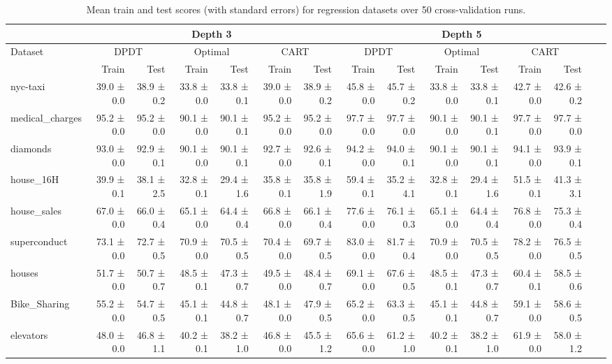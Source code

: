 \begin{table}
\centering
\footnotesize
\caption{Mean train and test scores (with standard errors) for regression datasets over 50 cross-validation runs.}\label{tab:regression}
\begin{tabular}{l|rr|rr|rr||rr|rr|rr|rr}
\hline
 & \multicolumn{6}{c||}{\textbf{Depth 3}} & \multicolumn{6}{c|}{\textbf{Depth 5}} \\ \hline
Dataset & \multicolumn{2}{c|}{DPDT} & \multicolumn{2}{c|}{Optimal} & \multicolumn{2}{c||}{CART} & \multicolumn{2}{c|}{DPDT} & \multicolumn{2}{c|}{Optimal} & \multicolumn{2}{c|}{CART} \\
 & Train & Test & Train & Test & Train & Test & Train & Test & Train & Test & Train & Test \\
\hline
nyc-taxi & 39.0 ± 0.0 & 38.9 ± 0.2 & 33.8 ± 0.0 & 33.8 ± 0.1 & 39.0 ± 0.0 & 38.9 ± 0.2 & 45.8 ± 0.0 & 45.7 ± 0.2 & 33.8 ± 0.0 & 33.8 ± 0.1 & 42.7 ± 0.0 & 42.6 ± 0.2 \\
medical\_charges & 95.2 ± 0.0 & 95.2 ± 0.0 & 90.1 ± 0.0 & 90.1 ± 0.1 & 95.2 ± 0.0 & 95.2 ± 0.0 & 97.7 ± 0.0 & 97.7 ± 0.0 & 90.1 ± 0.0 & 90.1 ± 0.1 & 97.7 ± 0.0 & 97.7 ± 0.0 \\
diamonds & 93.0 ± 0.0 & 92.9 ± 0.1 & 90.1 ± 0.0 & 90.1 ± 0.1 & 92.7 ± 0.0 & 92.6 ± 0.1 & 94.2 ± 0.0 & 94.0 ± 0.1 & 90.1 ± 0.0 & 90.1 ± 0.1 & 94.1 ± 0.0 & 93.9 ± 0.1 \\
house\_16H & 39.9 ± 0.1 & 38.1 ± 2.5 & 32.8 ± 0.1 & 29.4 ± 1.6 & 35.8 ± 0.1 & 35.8 ± 1.9 & 59.4 ± 0.1 & 35.2 ± 4.1 & 32.8 ± 0.1 & 29.4 ± 1.6 & 51.5 ± 0.1 & 41.3 ± 3.1 \\
house\_sales & 67.0 ± 0.0 & 66.0 ± 0.4 & 65.1 ± 0.0 & 64.4 ± 0.4 & 66.8 ± 0.0 & 66.1 ± 0.4 & 77.6 ± 0.0 & 76.1 ± 0.3 & 65.1 ± 0.0 & 64.4 ± 0.4 & 76.8 ± 0.0 & 75.3 ± 0.4 \\
superconduct & 73.1 ± 0.0 & 72.7 ± 0.5 & 70.9 ± 0.0 & 70.5 ± 0.5 & 70.4 ± 0.0 & 69.7 ± 0.5 & 83.0 ± 0.0 & 81.7 ± 0.4 & 70.9 ± 0.0 & 70.5 ± 0.5 & 78.2 ± 0.0 & 76.5 ± 0.5 \\
houses & 51.7 ± 0.0 & 50.7 ± 0.7 & 48.5 ± 0.1 & 47.3 ± 0.7 & 49.5 ± 0.0 & 48.4 ± 0.7 & 69.1 ± 0.0 & 67.6 ± 0.5 & 48.5 ± 0.1 & 47.3 ± 0.7 & 60.4 ± 0.1 & 58.5 ± 0.6 \\
Bike\_Sharing & 55.2 ± 0.0 & 54.7 ± 0.5 & 45.1 ± 0.1 & 44.8 ± 0.7 & 48.1 ± 0.0 & 47.9 ± 0.5 & 65.2 ± 0.0 & 63.3 ± 0.5 & 45.1 ± 0.1 & 44.8 ± 0.7 & 59.1 ± 0.0 & 58.6 ± 0.5 \\
elevators & 48.0 ± 0.0 & 46.8 ± 1.1 & 40.2 ± 0.1 & 38.2 ± 1.0 & 46.8 ± 0.0 & 45.5 ± 1.2 & 65.6 ± 0.0 & 61.2 ± 1.0 & 40.2 ± 0.1 & 38.2 ± 1.0 & 61.9 ± 0.0 & 58.0 ± 1.2 \\

\end{tabular}
\end{table}

